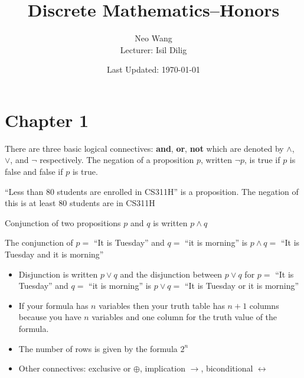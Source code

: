\documentclass{scrreprt}
\title{Discrete Mathematics--Honors}
\author{Neo Wang\\ Lecturer: Isil Dilig}
\date{Last Updated: \today}
\begin{document}
\maketitle

\chapter{Chapter 1}

There are three basic logical connectives: \textbf{and}, \textbf{or}, \textbf{not}
which are denoted by $\land$, $\lor$, and $\neg$ respectively.
The negation of a proposition $p$, written $\neg p$, is true if $p$ is false and false if $p$ is true.

\begin{example}
	``Less than 80 students are enrolled in CS311H'' is a proposition. The negation of this is at least $80$ students are in CS311H
\end{example}

Conjunction of two propositions $p$ and $q$ is written $p\land q$

\begin{example}
	The conjunction of $p=$ ``It is Tuesday'' and $q=$ ``it is morning'' is $p\land q=$ ``It is Tuesday and it is morning''
\end{example}

\begin{itemize}
\item Disjunction is written $p\lor q$ and the disjunction between $p\lor q$ for $p=$ ``It is Tuesday'' and $q=$ ``it is morning'' is $p\lor q=$ ``It is Tuesday or it is morning''
\item If your formula has $n$ variables then your truth table has $n+1$ columns because you have $n$ variables and one column for the truth value of the formula.
\item The number of rows is given by the formula $2^n$
\item Other connectives: exclusive or $\oplus$, implication $\rightarrow$, biconditional $\leftrightarrow$
\end{itemize}
\end{document}
